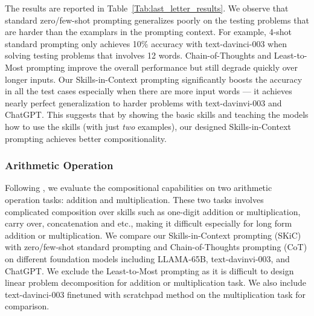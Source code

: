 The results are reported in Table~\ref{Tab:last_letter_results}. We observe that standard zero/few-shot prompting generalizes poorly on the testing problems that are harder than the examplars in the prompting context. For example, 4-shot standard prompting only achieves 10\% accuracy with text-davinci-003 when solving testing problems that involves 12 words. Chain-of-Thoughts and Least-to-Most prompting improve the overall performance but still degrade quickly over longer inputs. Our Skills-in-Context prompting  significantly boosts the accuracy in all the test cases especially when there are more input words --- it achieves nearly perfect generalization to harder problems with text-davinvi-003 and ChatGPT. This suggests that by showing the basic skills and teaching the models how to use the skills (with just \emph{two} examples), our designed Skills-in-Context prompting achieves better compositionality.



\subsubsection{Arithmetic Operation}
Following \citeauthor{dziri2023faith}, we evaluate the compositional capabilities on two arithmetic operation tasks: addition and multiplication. These two tasks involves complicated composition over skills such as one-digit addition or multiplication, carry over, concatenation and etc.\citep{dziri2023faith}, making it difficult especially for long form addition or multiplication. We compare our Skills-in-Context prompting (SKiC) with zero/few-shot standard prompting \citep{brown2020language} and Chain-of-Thoughts prompting (CoT) \citep{wei2022chain} on different foundation models including LLAMA-65B, text-davinvi-003, and ChatGPT. We exclude the Least-to-Most prompting \citep{zhou2022least} as it is difficult to design linear problem decomposition for addition or multiplication task. We also include text-davinci-003 finetuned with scratchpad method \citep{nye2021show,dziri2023faith} on the multiplication task for comparison.


